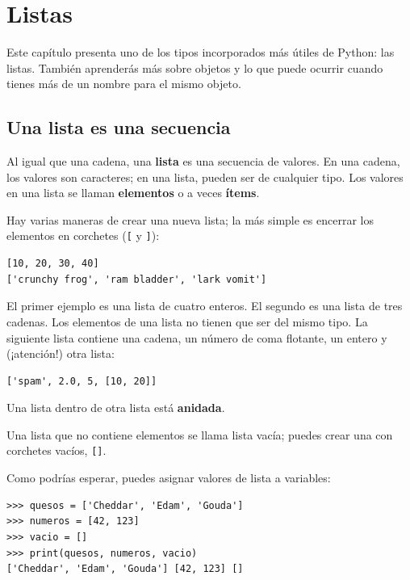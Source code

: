 \documentclass[10pt]{book}
\begin{document}
\chapter{Listas}

Este capítulo presenta uno de los tipos incorporados más útiles de Python: las listas.
También aprenderás más sobre objetos y lo que puede ocurrir cuando tienes
más de un nombre para el mismo objeto.


\section{Una lista es una secuencia}
\label{sequence}

Al igual que una cadena, una {\bf lista} es una secuencia de valores.  En una cadena, los
valores son caracteres; en una lista, pueden ser de cualquier tipo.  Los valores en
una lista se llaman {\bf elementos} o a veces {\bf ítems}.

Hay varias maneras de crear una nueva lista; la más simple es
encerrar los elementos en corchetes (\verb"[" y \verb"]"):

\begin{verbatim}
[10, 20, 30, 40]
['crunchy frog', 'ram bladder', 'lark vomit']
\end{verbatim}
%
El primer ejemplo es una lista de cuatro enteros.  El segundo es una lista de
tres cadenas.  Los elementos de una lista no tienen que ser del mismo tipo.
La siguiente lista contiene una cadena, un número de coma flotante, un entero y
(¡atención!) otra lista:

\begin{verbatim}
['spam', 2.0, 5, [10, 20]]
\end{verbatim}
%
Una lista dentro de otra lista está {\bf anidada}.

Una lista que no contiene elementos se
llama lista vacía; puedes crear una con corchetes
vacíos, \verb"[]".

Como podrías esperar, puedes asignar valores de lista a variables:

\begin{verbatim}
>>> quesos = ['Cheddar', 'Edam', 'Gouda']
>>> numeros = [42, 123]
>>> vacio = []
>>> print(quesos, numeros, vacio)
['Cheddar', 'Edam', 'Gouda'] [42, 123] []
\end{verbatim}
%
\end{document}
